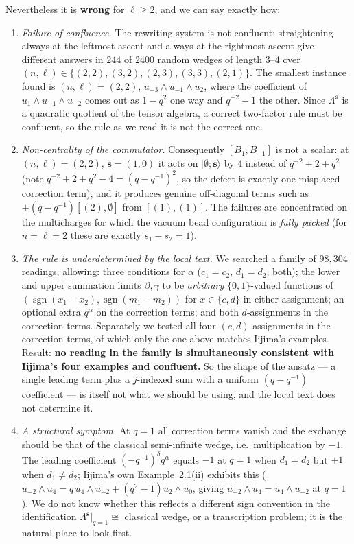 \documentclass[11pt]{article}
\theoremstyle{definition}
\newcommand{\bs}{\mathbf{s}}
\newcommand{\bemp}{\boldsymbol{\emptyset}}
\begin{document}
Nevertheless it is \textbf{wrong} for $\ell \ge 2$, and we can say exactly
how:
\begin{enumerate}
\item \emph{Failure of confluence.} The rewriting system is not confluent:
  straightening always at the leftmost ascent and always at the rightmost
  ascent give different answers in $244$ of $2400$ random wedges of length
  $3$--$4$ over $(n,\ell) \in \{(2,2),(3,2),(2,3),(3,3),(2,1)\}$. The
  smallest instance found is $(n,\ell) = (2,2)$,
  $u_{-3}\wedge u_{-1}\wedge u_2$, where the coefficient of
  $u_1 \wedge u_{-1} \wedge u_{-2}$ comes out as $1 - q^2$ one way and
  $q^{-2} - 1$ the other. Since $\Lambda^{\bs}$ is a quadratic quotient of
  the tensor algebra, a correct two-factor rule must be confluent, so the
  rule as we read it is not the correct one.
\item \emph{Non-centrality of the commutator.} Consequently
  $[B_1,B_{-1}]$ is not a scalar: at $(n,\ell) = (2,2)$, $\bs = (1,0)$ it
  acts on $|\bemp;\bs\rangle$ by $4$ instead of $q^{-2}+2+q^{2}$ (note
  $q^{-2}+2+q^{2}-4 = (q-q^{-1})^2$, so the defect is exactly one
  misplaced correction term), and it produces genuine off-diagonal terms
  such as $\pm(q - q^{-1})[(2),\emptyset] $ from $[(1),(1)]$. The failures
  are concentrated on the multicharges for which the vacuum bead
  configuration is \emph{fully packed} (for $n=\ell=2$ these are exactly
  $s_1 - s_2 = 1$).
\item \emph{The rule is underdetermined by the local text.} We searched a
  family of $98{,}304$ readings, allowing: three conditions for $\alpha$
  ($c_1 = c_2$, $d_1 = d_2$, both); the lower and upper summation limits
  $\beta,\gamma$ to be \emph{arbitrary} $\{0,1\}$-valued functions of
  $(\operatorname{sgn}(x_1 - x_2), \operatorname{sgn}(m_1-m_2))$ for
  $x \in \{c,d\}$ in either assignment; an optional extra $q^\alpha$ on the
  correction terms; and both $d$-assignments in the correction terms.
  Separately we tested all four $(c,d)$-assignments in the correction
  terms, of which only the one above matches Iijima's examples. Result:
  \textbf{no reading in the family is simultaneously consistent with
  Iijima's four examples and confluent.} So the shape of the ansatz --- a
  single leading term plus a $j$-indexed sum with a uniform
  $(q-q^{-1})$ coefficient --- is itself not what we should be using, and
  the local text does not determine it.
\item \emph{A structural symptom.} At $q = 1$ all correction terms vanish
  and the exchange should be that of the classical semi-infinite wedge,
  i.e.\ multiplication by $-1$. The leading coefficient
  $(-q^{-1})^{\delta}q^{\alpha}$ equals $-1$ at $q=1$ when $d_1 = d_2$ but
  $+1$ when $d_1 \ne d_2$; Iijima's own Example~2.1(ii) exhibits this
  ($u_{-2}\wedge u_4 = q\,u_4\wedge u_{-2} + (q^2-1)u_2\wedge u_0$, giving
  $u_{-2}\wedge u_4 = u_4 \wedge u_{-2}$ at $q=1$). We do not know whether
  this reflects a different sign convention in the identification
  $\Lambda^{\bs}|_{q=1} \cong$ classical wedge, or a transcription problem;
  it is the natural place to look first.
\end{enumerate}
\end{document}
